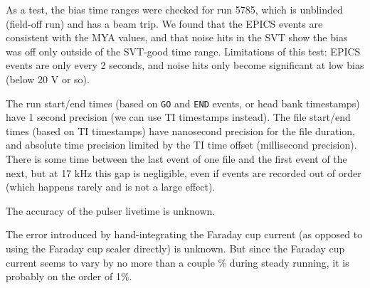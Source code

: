 \documentclass[aps,amsmath,amssymb,notitlepage,11pt,onecolumn]{revtex4-1}
\begin{document}
As a test, the bias time ranges were checked for run 5785, which is unblinded (field-off run) and has a beam trip.
We found that the EPICS events are consistent with the MYA values, and that noise hits in the SVT show the bias was off only outside of the SVT-good time range.
Limitations of this test: EPICS events are only every 2 seconds, and noise hits only become significant at low bias (below 20 V or so).

The run start/end times (based on \texttt{GO} and \texttt{END} events, or head bank timestamps) have 1 second precision (we can use TI timestamps instead).
The file start/end times (based on TI timestamps) have nanosecond precision for the file duration, and absolute time precision limited by the TI time offset (millisecond precision).
There is some time between the last event of one file and the first event of the next, but at 17 kHz this gap is negligible, even if events are recorded out of order (which happens rarely and is not a large effect).

The accuracy of the pulser livetime is unknown.

The error introduced by hand-integrating the Faraday cup current (as opposed to using the Faraday cup scaler directly) is unknown.
But since the Faraday cup current seems to vary by no more than a couple \% during steady running, it is probably on the order of 1\%.
\end{document}
